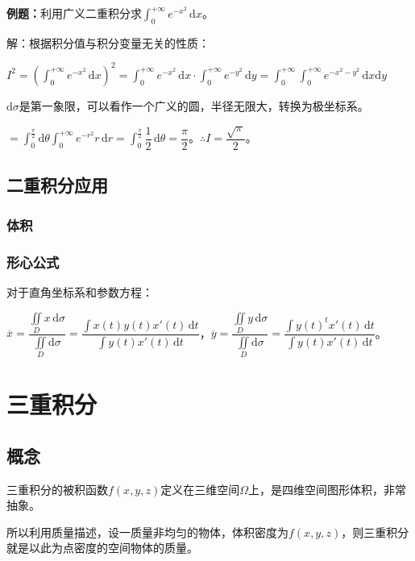 \textbf{例题：}利用广义二重积分求$\int_0^{+\infty}e^{-x^2}\,\textrm{d}x$。

解：根据积分值与积分变量无关的性质：

$I^2=(\int_0^{+\infty}e^{-x^2}\,\textrm{d}x)^2=\int_0^{+\infty}e^{-x^2}\,\textrm{d}x\cdot\int_0^{+\infty}e^{-y^2}\,\textrm{d}y=\int_0^{+\infty}\int_0^{+\infty}e^{-x^2-y^2}\,\textrm{d}x\textrm{d}y$

$\textrm{d}\sigma$是第一象限，可以看作一个广义的圆，半径无限大，转换为极坐标系。

$=\int_0^\frac{\pi}{2}\textrm{d}\theta\int_0^{+\infty}e^{-r^2}r\,\textrm{d}r=\displaystyle{\int_0^\frac{\pi}{2}\dfrac{1}{2}\,\textrm{d}\theta}=\dfrac{\pi}{2}$。$\therefore I=\dfrac{\sqrt{\pi}}{2}$。

\subsection{二重积分应用}

\subsubsection{体积}

\subsubsection{形心公式}

对于直角坐标系和参数方程：

$\overline{x}=\dfrac{\iint\limits_Dx\,\textrm{d}\sigma}{\iint\limits_D\textrm{d}\sigma}=\dfrac{\int x(t)y(t)x'(t)\,\textrm{d}t}{\int y(t)x'(t)\,\textrm{d}t}$，$\overline{y}=\dfrac{\iint\limits_Dy\,\textrm{d}\sigma}{\iint\limits_D\textrm{d}\sigma}=\dfrac{\int y(t)^tx'(t)\,\textrm{d}t}{\int y(t)x'(t)\,\textrm{d}t}$。

\section{三重积分}

\subsection{概念}

三重积分的被积函数$f(x,y,z)$定义在三维空间$\Omega$上，是四维空间图形体积，非常抽象。

所以利用质量描述，设一质量非均匀的物体，体积密度为$f(x,y,z)$，则三重积分就是以此为点密度的空间物体的质量。

